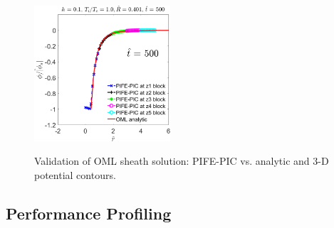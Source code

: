 \documentclass{siamart171218}
\begin{document}
\begin{figure}[ht]
\centering
\begin{subfigmatrix}{2} %
{\includegraphics[width=0.45\textwidth]{oml_125_v235_benchmark_5.png}}
\end{subfigmatrix}
\caption{%
Validation of OML sheath solution: PIFE-PIC vs. analytic and 3-D potential contours.}
\label{fig:results}
\end{figure}



\subsection{Performance Profiling}
\end{document}
